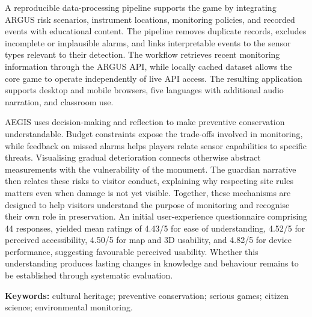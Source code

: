 \documentclass[11pt,a4paper]{article}
\begin{document}
A reproducible data-processing pipeline supports the game by integrating ARGUS risk scenarios, instrument locations, monitoring policies, and recorded events with educational content. The pipeline removes duplicate records, excludes incomplete or implausible alarms, and links interpretable events to the sensor types relevant to their detection. The workflow retrieves recent monitoring information through the ARGUS API, while locally cached dataset allows the core game to operate independently of live API access. The resulting application supports desktop and mobile browsers, five languages with additional audio narration, and classroom use.

AEGIS uses decision-making and reflection to make preventive conservation understandable. Budget constraints expose the trade-offs involved in monitoring, while feedback on missed alarms helps players relate sensor capabilities to specific threats. Visualising gradual deterioration connects otherwise abstract measurements with the vulnerability of the monument. The guardian narrative then relates these risks to visitor conduct, explaining why respecting site rules matters even when damage is not yet visible. Together, these mechanisms are designed to help visitors understand the purpose of monitoring and recognise their own role in preservation. An initial user-experience questionnaire comprising 44 responses, yielded mean ratings of 4.43/5 for ease of understanding, 4.52/5 for perceived accessibility, 4.50/5 for map and 3D usability, and 4.82/5 for device performance, suggesting favourable perceived usability. Whether this understanding produces lasting changes in knowledge and behaviour remains to be established through systematic evaluation.

\medskip
{\small\textbf{Keywords:} cultural heritage; preventive conservation; serious games; citizen science; environmental monitoring.}
\end{document}
